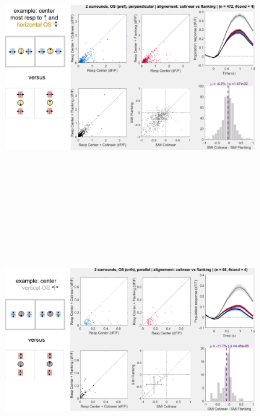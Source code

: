 \begin{figure}[H] \centering \includegraphics[width=11cm,height=11cm,keepaspectratio]{Figures/7.Results/population/sel/diagrams/14.png} 
\end{figure}

\begin{figure}[H] \centering \includegraphics[width=11cm,height=11cm,keepaspectratio]{Figures/7.Results/population/sel/diagrams/15.png} 
\end{figure}

